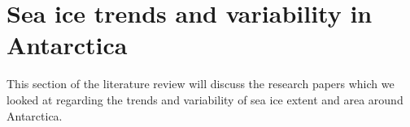 \documentclass[../main.tex]{subfiles}
\begin{document}
\section{Sea ice trends and variability in Antarctica}
This section of the literature review will discuss the research papers which we looked at regarding the trends and variability of sea ice extent and area around Antarctica.
\end{document}
